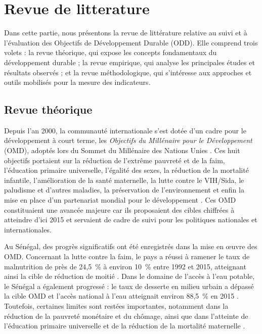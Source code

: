 \chapter{Revue de litterature}

\begin{simplebox2}
	Dans cette partie, nous présentons la revue de littérature relative au suivi et à l’évaluation des Objectifs de Développement Durable (ODD).  
	Elle comprend trois volets : la revue théorique, qui expose les concepts fondamentaux du développement durable ; la revue empirique, qui analyse les principales études et résultats observés ; et la revue méthodologique, qui s’intéresse aux approches et outils mobilisés pour la mesure des indicateurs.  
\end{simplebox2}

	

\section{Revue théorique}
Depuis l’an 2000, la communauté internationale s’est dotée d’un cadre pour le développement à court terme, les \textit{Objectifs du Millénaire pour le Développement} (OMD), adoptés lors du Sommet du Millénaire des Nations Unies \autocite{un2000}. Ces huit objectifs portaient sur la réduction de l’extrême pauvreté et de la faim, l’éducation primaire universelle, l’égalité des sexes, la réduction de la mortalité infantile, l’amélioration de la santé maternelle, la lutte contre le VIH/Sida, le paludisme et d’autres maladies, la préservation de l’environnement et enfin la mise en place d’un partenariat mondial pour le développement \autocite{who2015}. Ces OMD constituaient une avancée majeure car ils proposaient des cibles chiffrées à atteindre d’ici 2015 et servaient de cadre de suivi pour les politiques nationales et internationales.

Au Sénégal, des progrès significatifs ont été enregistrés dans la mise en œuvre des OMD. Concernant la lutte contre la faim, le pays a réussi à ramener le taux de malnutrition de près de 24,5~\% à environ 10~\% entre 1992 et 2015, atteignant ainsi la cible de réduction de moitié \autocite{fao2015}. Dans le domaine de l’accès à l’eau potable, le Sénégal a également progressé : le taux de desserte en milieu urbain a dépassé la cible OMD et l’accès national à l’eau atteignait environ 88,5~\% en 2015 \autocite{bm2015}. Toutefois, certaines limites sont restées importantes, notamment dans la réduction de la pauvreté monétaire et du chômage, ainsi que dans l’atteinte de l’éducation primaire universelle et de la réduction de la mortalité maternelle \autocite{lo2015}.

